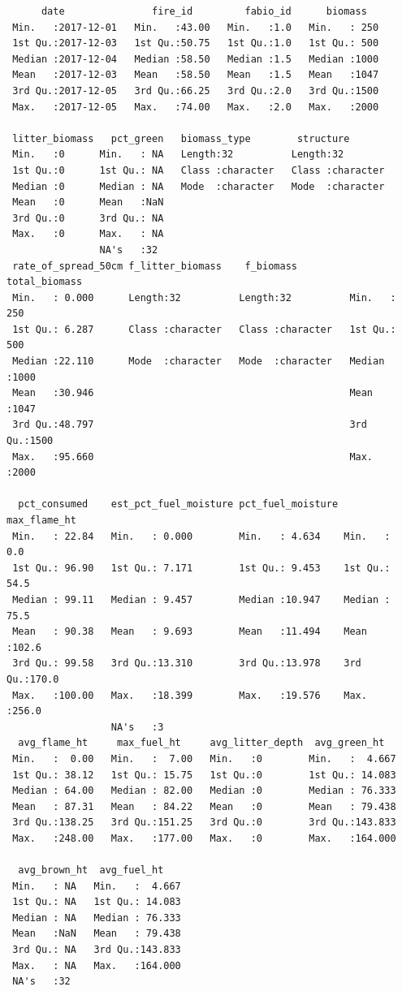 \documentclass[11pt,a4paper]{article}
\begin{document}
\begin{verbatim}
      date               fire_id         fabio_id      biomass    
 Min.   :2017-12-01   Min.   :43.00   Min.   :1.0   Min.   : 250  
 1st Qu.:2017-12-03   1st Qu.:50.75   1st Qu.:1.0   1st Qu.: 500  
 Median :2017-12-04   Median :58.50   Median :1.5   Median :1000  
 Mean   :2017-12-03   Mean   :58.50   Mean   :1.5   Mean   :1047  
 3rd Qu.:2017-12-05   3rd Qu.:66.25   3rd Qu.:2.0   3rd Qu.:1500  
 Max.   :2017-12-05   Max.   :74.00   Max.   :2.0   Max.   :2000  
                                                                  
 litter_biomass   pct_green   biomass_type        structure        
 Min.   :0      Min.   : NA   Length:32          Length:32         
 1st Qu.:0      1st Qu.: NA   Class :character   Class :character  
 Median :0      Median : NA   Mode  :character   Mode  :character  
 Mean   :0      Mean   :NaN                                        
 3rd Qu.:0      3rd Qu.: NA                                        
 Max.   :0      Max.   : NA                                        
                NA's   :32                                         
 rate_of_spread_50cm f_litter_biomass    f_biomass         total_biomass 
 Min.   : 0.000      Length:32          Length:32          Min.   : 250  
 1st Qu.: 6.287      Class :character   Class :character   1st Qu.: 500  
 Median :22.110      Mode  :character   Mode  :character   Median :1000  
 Mean   :30.946                                            Mean   :1047  
 3rd Qu.:48.797                                            3rd Qu.:1500  
 Max.   :95.660                                            Max.   :2000  
                                                                         
  pct_consumed    est_pct_fuel_moisture pct_fuel_moisture  max_flame_ht  
 Min.   : 22.84   Min.   : 0.000        Min.   : 4.634    Min.   :  0.0  
 1st Qu.: 96.90   1st Qu.: 7.171        1st Qu.: 9.453    1st Qu.: 54.5  
 Median : 99.11   Median : 9.457        Median :10.947    Median : 75.5  
 Mean   : 90.38   Mean   : 9.693        Mean   :11.494    Mean   :102.6  
 3rd Qu.: 99.58   3rd Qu.:13.310        3rd Qu.:13.978    3rd Qu.:170.0  
 Max.   :100.00   Max.   :18.399        Max.   :19.576    Max.   :256.0  
                  NA's   :3                                              
  avg_flame_ht     max_fuel_ht     avg_litter_depth  avg_green_ht    
 Min.   :  0.00   Min.   :  7.00   Min.   :0        Min.   :  4.667  
 1st Qu.: 38.12   1st Qu.: 15.75   1st Qu.:0        1st Qu.: 14.083  
 Median : 64.00   Median : 82.00   Median :0        Median : 76.333  
 Mean   : 87.31   Mean   : 84.22   Mean   :0        Mean   : 79.438  
 3rd Qu.:138.25   3rd Qu.:151.25   3rd Qu.:0        3rd Qu.:143.833  
 Max.   :248.00   Max.   :177.00   Max.   :0        Max.   :164.000  
                                                                     
  avg_brown_ht  avg_fuel_ht     
 Min.   : NA   Min.   :  4.667  
 1st Qu.: NA   1st Qu.: 14.083  
 Median : NA   Median : 76.333  
 Mean   :NaN   Mean   : 79.438  
 3rd Qu.: NA   3rd Qu.:143.833  
 Max.   : NA   Max.   :164.000  
 NA's   :32                     
\end{verbatim}
\end{document}
